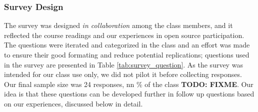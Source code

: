 \subsubsection{Survey Design}

The survey was designed {\it in collaboration} among the class members, and it reflected the course readings and our experiences in open source participation. The questions were iterated and categorized in the class and an effort was made to ensure their good formating and reduce potential replications; questions used in the survey are presented in Table \ref{tab:survey_question}. As the survey was intended for our class use only, we did not pilot it before collecting responses. Our final sample size was 24 responses, nn \% of the class \textbf{TODO: FIXME}. Our idea is that these questions can be developed further in follow up questions based on our experiences, discussed below in detail.


